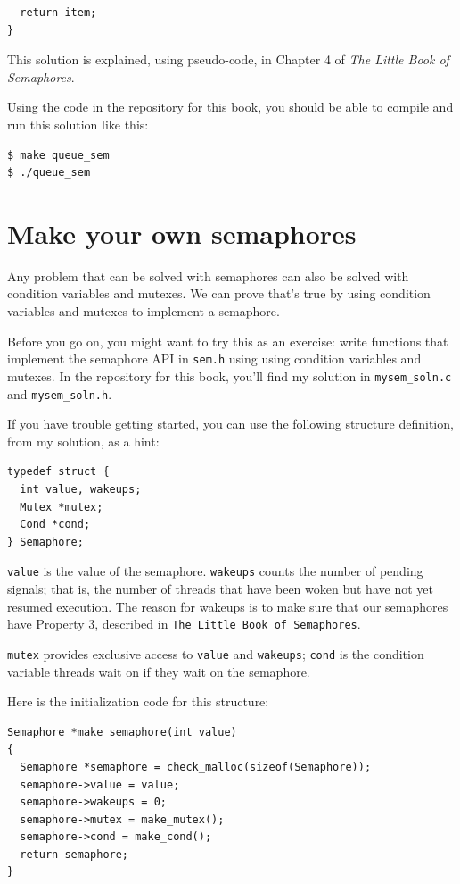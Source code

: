 \documentclass[12pt]{book}
\begin{document}
{\begin{verbatim}
  return item;
}
\end{verbatim}

This solution is explained, using pseudo-code, in Chapter 4 of
{\it The Little Book of Semaphores}.

Using the code in the repository for this book, you should be able to compile and run this solution like this:

\begin{verbatim}
$ make queue_sem
$ ./queue_sem
\end{verbatim}



\section{Make your own semaphores}
\label{makeyourown}

Any problem that can be solved with semaphores can also be solved
with condition variables and mutexes.  We can prove that's true
by using condition variables and mutexes to implement a semaphore.

Before you go on, you might want to try this as an exercise: write
functions that implement the semaphore API in {\tt sem.h}
using using condition variables and mutexes.  In the repository for this book, you'll find my solution in \verb"mysem_soln.c" and
\verb"mysem_soln.h".

If you have trouble getting started, you can use the following
structure definition, from my solution, as a hint:

\begin{verbatim}
typedef struct {
  int value, wakeups;
  Mutex *mutex;
  Cond *cond;
} Semaphore;
\end{verbatim}


{\tt value} is the value of the semaphore.  {\tt wakeups} counts
the number of pending signals; that is, the number of threads
that have been woken but have not yet resumed execution.  The reason
for wakeups is to make sure that our semaphores have
Property 3, described in {\tt The Little Book of Semaphores}.

{\tt mutex} provides exclusive access to {\tt value} and
{\tt wakeups}; {\tt cond} is the condition variable threads
wait on if they wait on the semaphore.

Here is the initialization code for this structure:

\begin{verbatim}
Semaphore *make_semaphore(int value)
{
  Semaphore *semaphore = check_malloc(sizeof(Semaphore));
  semaphore->value = value;
  semaphore->wakeups = 0;
  semaphore->mutex = make_mutex();
  semaphore->cond = make_cond();
  return semaphore;
}
\end{verbatim}


}
\end{document}
